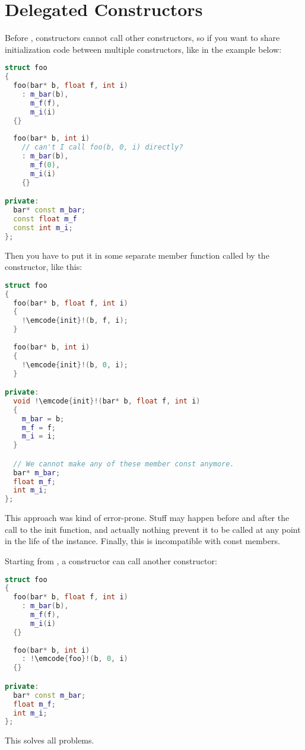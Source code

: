 \section{Delegated Constructors}

Before , constructors cannot call other constructors, so if you
want to share initialization code between multiple constructors,
like in the example below:

\begin{lstlisting}[language=c++]
struct foo
{
  foo(bar* b, float f, int i)
    : m_bar(b),
      m_f(f),
      m_i(i)
  {}
  
  foo(bar* b, int i)
    // can't I call foo(b, 0, i) directly?
    : m_bar(b),
      m_f(0),
      m_i(i)
    {}

private:
  bar* const m_bar;
  const float m_f
  const int m_i;
};
\end{lstlisting}

Then you have to put it in some separate member function called by the
constructor, like this:

\begin{lstlisting}[language=c++,escapechar=!]
struct foo
{
  foo(bar* b, float f, int i)
  {
    !\emcode{init}!(b, f, i);
  }
  
  foo(bar* b, int i)
  {
    !\emcode{init}!(b, 0, i);
  }

private:
  void !\emcode{init}!(bar* b, float f, int i)
  {
    m_bar = b;
    m_f = f;
    m_i = i;
  }

  // We cannot make any of these member const anymore.
  bar* m_bar;
  float m_f;  
  int m_i;
};
\end{lstlisting}

This approach was kind of error-prone. Stuff may happen before and
after the call to the init function, and actually nothing prevent it
to be called at any point in the life of the instance. Finally, this
is incompatible with const members.


Starting from , a constructor can call another constructor:

\begin{lstlisting}[language=c++,escapechar=!]
struct foo
{
  foo(bar* b, float f, int i)
    : m_bar(b),
      m_f(f),
      m_i(i)
  {}
  
  foo(bar* b, int i)
    : !\emcode{foo}!(b, 0, i)
  {}

private:
  bar* const m_bar;
  float m_f;
  int m_i;
};
\end{lstlisting}

This solves all problems.
